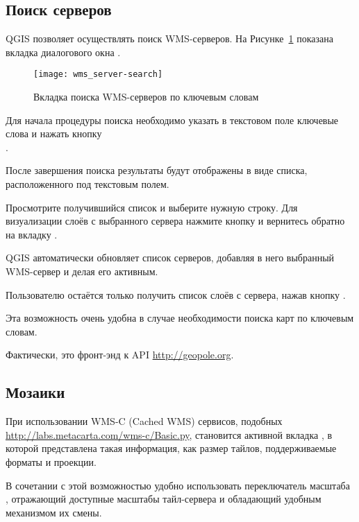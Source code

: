 %
%
\subsection{Поиск серверов}
\label{sec:serversearch}

QGIS позволяет осуществлять поиск WMS-серверов. На Рисунке~\ref{fig:searchtab}
показана вкладка  диалогового окна
.

\begin{figure}[ht]
  \centering
  \texttt{[image: wms\_server-search]}
    \caption{Вкладка поиска WMS-серверов по ключевым словам
    \wincaption}\label{fig:searchtab}
\end{figure}

Для начала процедуры поиска необходимо указать в текстовом поле ключевые
слова и нажать кнопку \\ .

После завершения поиска результаты будут отображены в виде списка,
расположенного под текстовым полем.

Просмотрите получившийся список и выберите нужную строку. Для визуализации
слоёв с выбранного сервера нажмите кнопку  и вернитесь обратно на вкладку .

QGIS автоматически обновляет список серверов, добавляя в него выбранный
WMS-сервер и делая его активным.

Пользователю остаётся только получить список слоёв с сервера, нажав кнопку
.

Эта возможность очень удобна в случае необходимости поиска карт по
ключевым словам.

Фактически, это фронт-энд к API \url{http://geopole.org}.

%
%
\subsection{Мозаики}\label{sec:tilesets}

При использовании WMS-C (Cached WMS) сервисов, подобных
\url{http://labs.metacarta.com/wms-c/Basic.py}, становится активной вкладка
, в которой представлена такая информация, как размер
тайлов, поддерживаемые форматы и проекции.

В сочетании с этой возможностью удобно использовать переключатель масштаба
 \arrow \\
, отражающий доступные масштабы
тайл-сервера и обладающий удобным механизмом их смены.
%
%
